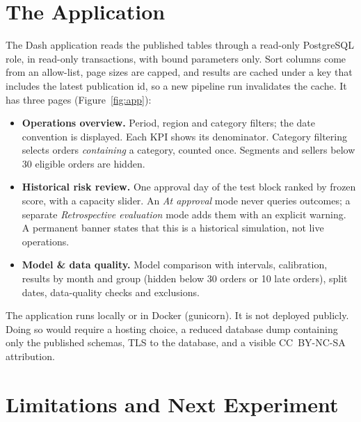 \documentclass[10pt,twocolumn]{article}
\begin{document}
\section{The Application}\label{sec:app}

The Dash application reads the published tables through a read-only PostgreSQL role, in read-only
transactions, with bound parameters only. Sort columns come from an allow-list, page sizes are capped,
and results are cached under a key that includes the latest publication id, so a new pipeline run
invalidates the cache. It has three pages (Figure~\ref{fig:app}):
\begin{itemize}
\item \textbf{Operations overview.} Period, region and category filters; the date convention is
      displayed. Each KPI shows its denominator. Category filtering selects orders \emph{containing}
      a category, counted once. Segments and sellers below 30 eligible orders are hidden.
\item \textbf{Historical risk review.} One approval day of the test block ranked by frozen score, with a
      capacity slider. An \emph{At approval} mode never queries outcomes; a separate
      \emph{Retrospective evaluation} mode adds them with an explicit warning. A permanent banner
      states that this is a historical simulation, not live operations.
\item \textbf{Model \& data quality.} Model comparison with intervals, calibration, results by month
      and group (hidden below 30 orders or 10 late orders), split dates, data-quality checks and
      exclusions.
\end{itemize}
The application runs locally or in Docker (gunicorn). It is not deployed publicly. Doing so would
require a hosting choice, a reduced database dump containing only the published schemas, TLS to the
database, and a visible CC~BY-NC-SA attribution.


\section{Limitations and Next Experiment}\label{sec:limits}
\end{document}
